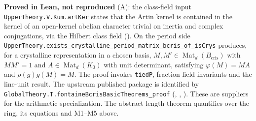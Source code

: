 \textbf{Proved in Lean, not reproduced} (A): the class-field input
\nolinkurl{UpperTheory.V.Kum.artKer} states that the Artin kernel is
contained in the kernel of an open-kernel abelian character trivial
on inertia and complex conjugations, via the Hilbert class field
().
On the period side \nolinkurl{UpperTheory.exists_crystalline_period_matrix_bcris_of_isCrys}
produces, for a crystalline representation in a chosen basis,
$M,M'\in\operatorname{Mat}_d(B_{\mathrm{cris}})$ with $MM'=1$ and
$A\in\operatorname{Mat}_d(K_0)$ with unit determinant, satisfying
$\varphi(M)=MA$ and $\rho(g)g(M)=M$. The proof invokes
\nolinkurl{tiedP}, fraction-field invariants and the line-unit result.
The upstream published package is identified by
\nolinkurl{GlobalTheory.T.fontaineBcrisBasicTheorems_proof}
(,
,
).
These are suppliers for the arithmetic specialization. The abstract
length theorem quantifies over the ring, its equations and M1--M5 above.

